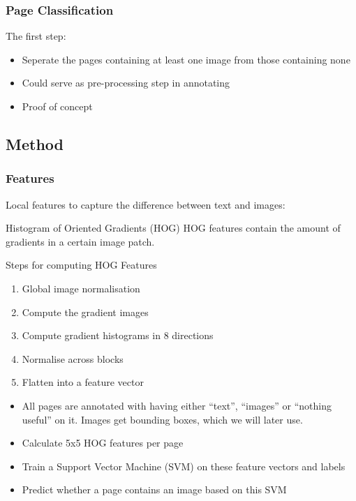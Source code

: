 \begin{frame}
\frametitle{Page Classification}
The first step:
\begin{itemize}
\item Seperate the pages containing at least one image from those
containing none
\item Could serve as pre-processing step in annotating
\item Proof of concept
\end{itemize}
\end{frame}



\subsection{Method}

\begin{frame}
\frametitle{Features}
Local features to capture the difference between text and images:
	\begin{block}{Histogram of Oriented Gradients (HOG)}
		HOG features contain the amount of gradients in a certain image patch.
	\end{block}
	\begin{block}{Steps for computing HOG Features\cite{dalal2005histograms}}
	\begin{enumerate}
		\item Global image normalisation
		\item Compute the gradient images
		\item Compute gradient histograms in 8 directions
		\item Normalise across blocks
		\item Flatten into a feature vector
	\end{enumerate}
	\end{block}
\end{frame}


{
	\begin{itemize}
		\item All pages are annotated with having either ``text'', ``images'' or
		``nothing useful'' on it. Images get bounding boxes, which we will later
		use.
		\item Calculate 5x5 HOG features per page
		\item Train a Support Vector Machine (SVM) on these feature vectors and
		labels
		\item Predict whether a page contains an image based on this SVM
	\end{itemize}
}

